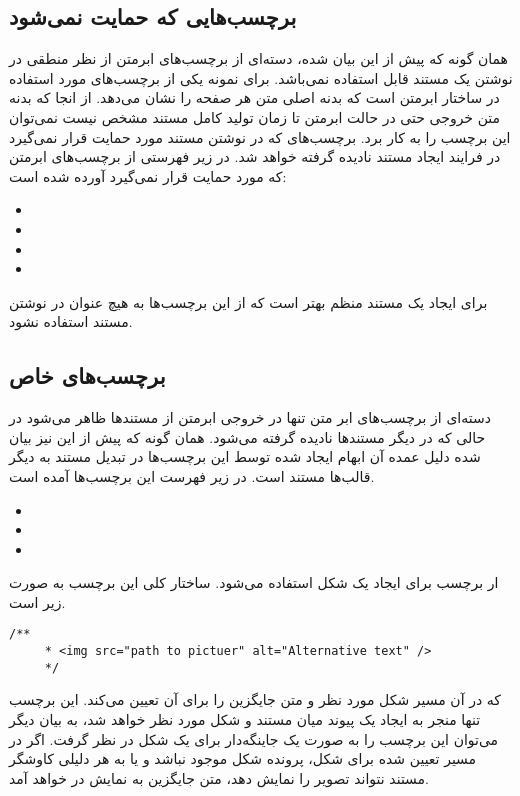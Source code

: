 \subsection{برچسب‌هایی که حمایت نمی‌شود}
همان گونه که پیش از این بیان شده، دسته‌ای از برچسب‌های ابرمتن از نظر منطقی در نوشتن یک مستند قابل استفاده نمی‌باشد. برای نمونه
یکی از برچسب‌های مورد استفاده در ساختار ابرمتن  است که بدنه اصلی متن هر صفحه را نشان می‌دهد. از انجا که بدنه متن
خروجی حتی در حالت ابرمتن تا زمان تولید کامل مستند مشخص نیست نمی‌توان این برچسب را به کار برد. برچسب‌های که در نوشتن مستند
مورد حمایت قرار نمی‌گیرد در فرایند ایجاد مستند نادیده گرفته خواهد شد. در زیر فهرستی از برچسب‌های ابرمتن که مورد حمایت قرار نمی‌گیرد 
آورده شده است:
\begin{itemize}
 \item {}
 \item {}
 \item {}
 \item {}
\end{itemize}

\begin{note}
 برای ایجاد یک مستند منظم بهتر است که از این برچسب‌ها به هیچ عنوان در نوشتن مستند استفاده نشود.
\end{note}

\subsection{برچسب‌های خاص}
دسته‌ای از برچسب‌های ابر متن تنها در خروجی ابرمتن از مستند‌ها ظاهر می‌شود  در حالی که در دیگر مستند‌ها نادیده گرفته می‌شود.
همان گونه که پیش از این نیز بیان شده دلیل عمده آن ابهام ایجاد شده توسط این برچسب‌ها در تبدیل مستند به دیگر قالب‌ها مستند است.
در زیر فهرست این برچسب‌ها آمده است.
\begin{itemize}
 \item {}
 \item {}
 \item {}
\end{itemize}
ار برچسب  برای ایجاد یک شکل استفاده می‌شود. ساختار کلی این برچسب به صورت زیر است.
\begin{latin}
\lstset{language=C++}  
\begin{lstlisting}[frame=single] 
    /**
     * <img src="path to pictuer" alt="Alternative text" />
     */
\end{lstlisting}
\end{latin}
که در آن  مسیر شکل مورد نظر و  متن جایگزین را برای آن تعیین می‌کند. این برچسب تنها
منجر به ایجاد یک پیوند میان مستند و شکل مورد نظر خواهد شد، به بیان دیگر می‌توان این برچسب را به صورت
یک جاینگه‌دار برای یک شکل در نظر گرفت. اگر در مسیر تعیین شده برای شکل، پرونده شکل موجود نباشد و یا
به هر دلیلی کاوشگر مستند نتواند تصویر را نمایش دهد، متن جایگزین به نمایش در خواهد آمد.

